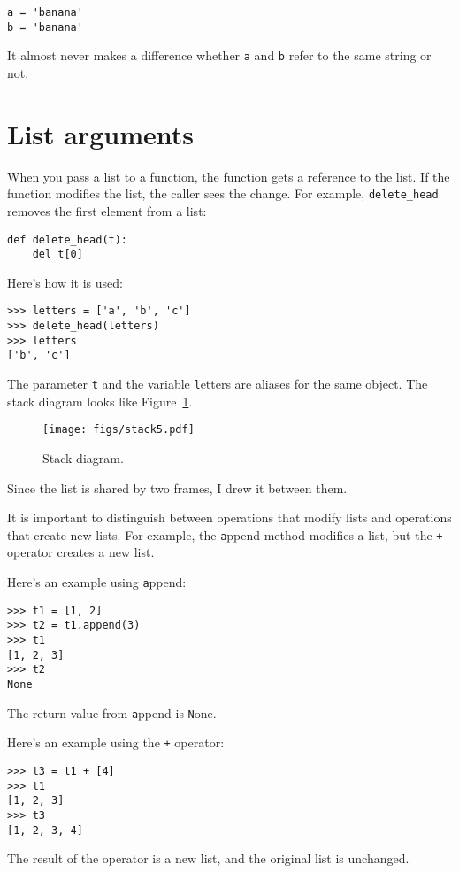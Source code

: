 \documentclass[
DIV=11,
fontsize=13,
twoside,
headinclude=false,
titlepage=firstiscover,
abstract=true,
headsepline=true,
footsepline=true,
chapterprefix=true, %
headings=big,
bibliography=totoc,%
captions=tableheading
]{scrbook}
\theoremstyle{definition}
\begin{document}
\begin{lstlisting}
a = 'banana'
b = 'banana'
\end{lstlisting}
%
It almost never makes a difference whether {\texttt a} and {\texttt b} refer
to the same string or not.


\section{List arguments}
\label{list.arguments}

When you pass a list to a function, the function gets a reference to
the list.  If the function modifies the list, the caller sees
the change.  For example, \verb"delete_head" removes the first element
from a list:

\begin{lstlisting}
def delete_head(t):
    del t[0]
\end{lstlisting}
%
Here's how it is used:

\begin{lstlisting}
>>> letters = ['a', 'b', 'c']
>>> delete_head(letters)
>>> letters
['b', 'c']
\end{lstlisting}
%
The parameter {\texttt t} and the variable {\texttt letters} are
aliases for the same object.  The stack diagram looks like
Figure~\ref{fig.stack5}.

\begin{figure}
\centerline
{\texttt{[image: figs/stack5.pdf]}}
\caption{Stack diagram.}
\label{fig.stack5}
\end{figure}

Since the list is shared by two frames, I drew
it between them.

It is important to distinguish between operations that
modify lists and operations that create new lists.  For
example, the {\texttt append} method modifies a list, but the
{\texttt +} operator creates a new list.

Here's an example using {\texttt append}:
%
\begin{lstlisting}
>>> t1 = [1, 2]
>>> t2 = t1.append(3)
>>> t1
[1, 2, 3]
>>> t2
None
\end{lstlisting}
%
The return value from {\texttt append} is {\texttt None}.

Here's an example using the {\texttt +} operator:
%
\begin{lstlisting}
>>> t3 = t1 + [4]
>>> t1
[1, 2, 3]
>>> t3
[1, 2, 3, 4]
\end{lstlisting}
%
The result of the operator is a new list, and the original list is
unchanged.
\end{document}

